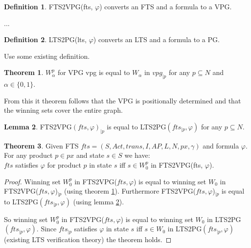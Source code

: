 \documentclass[]{article}
\theoremstyle{definition}
\newtheorem{definition}{Definition}[section]
\newtheorem{theorem}{Theorem}[section]
\newtheorem{lemma}[theorem]{Lemma}
\begin{document}
\begin{definition}
	FTS2VPG(fts, $\varphi$) converts an FTS and a formula to a VPG. 
	
	...
\end{definition}

\begin{definition}
LTS2PG(lts, $\varphi$) converts an LTS and a formula to a PG.

Use some existing definition.
\end{definition}

\begin{theorem}
	\label{vpgproj}
	$W_\alpha^p$ for VPG vpg is equal to $W_\alpha$ in $vpg_{|p}$ for any $p \subseteq N$ and $\alpha \in \{0,1\}$.
\end{theorem}

From this it theorem follows that the VPG is positionally determined and that the winning sets cover the entire graph.

\begin{lemma}
	\label{vpgftsproj}
	FTS2VPG$(fts, \varphi)_{|p}$ is equal to LTS2PG$(fts_{|p},\varphi)$ for any $p \subseteq N$.
\end{lemma}

\begin{theorem}
	Given FTS $fts = (S, Act, trans, I, AP, L, N, px, \gamma)$ and formula $\varphi$.\\
	For any product $p \in px$ and state $s \in S$ we have:\\
	$fts$ satisfies $\varphi$ for product $p$ in state $s$ iff $s \in W_0^p$ in FTS2VPG(fts, $\varphi$).
\begin{proof}
	
	Winning set $W_0^p$ in FTS2VPG($fts, \varphi$) is equal to winning set $W_0$ in FTS2VPG($fts, \varphi$)$_{|p}$ (using theorem \ref{vpgproj}). Furthermore FTS2VPG($fts, \varphi$)$_{|p}$ is equal to LTS2PG$(fts_{|p}, \varphi)$ (using lemma \ref{vpgftsproj}).
	
	So winning set  $W_0^p$ in FTS2VPG($fts, \varphi$) is equal to winning set $W_0$ in LTS2PG$(fts_{|p}, \varphi)$.
	Since $fts_{|p}$ satisfies $\varphi$ in state $s$ iff $s \in W_0$ in LTS2PG$(fts_{|p}, \varphi)$ (existing LTS verification theory) the theorem holds.
\end{proof}
\end{theorem}
 

\end{document}
